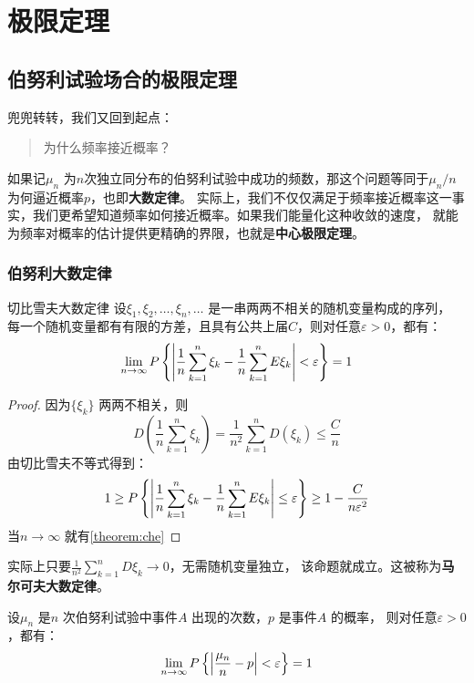 \chapter{极限定理}
\section{伯努利试验场合的极限定理}
兜兜转转，我们又回到起点：
\begin{quote}
    为什么频率接近概率？
\end{quote}

如果记\(\mu_{n}\) 为\(n\)次独立同分布的伯努利试验中成功的频数，那这个问题等同于\(\mu_{n}/n\)
为何逼近概率\(p\)，也即\textbf{大数定律}。
实际上，我们不仅仅满足于频率接近概率这一事实，我们更希望知道频率如何接近概率。如果我们能量化这种收敛的速度，
就能为频率对概率的估计提供更精确的界限，也就是\textbf{中心极限定理}。
\subsection{伯努利大数定律}
\begin{theorem}[che]{切比雪夫大数定律}
    设\(\xi_{1}, \xi_2, \dots ,\xi_{n},\dots \) 是一串两两不相关的随机变量构成的序列，
    每一个随机变量都有有限的方差，且具有公共上届\(C\)，则对任意\(\varepsilon>0\)，都有：
    \[
        \lim_{n \to \infty} P\left\{\left|\frac{1}{n} \sum_{k=1}^{n} \xi_{k} -
        \frac{1}{n} \sum_{k=1}^{n} E\xi_{k}\right| < \varepsilon\right\} = 1
    \]
\end{theorem}

\begin{proof}
    因为\(\{\xi_{k}\}\) 两两不相关，则\[
        D\left( \frac{1}{n} \sum_{k=1}^{n} \xi_{k} \right) =
        \frac{1}{n^2} \sum_{k=1}^{n} D(\xi_{k}) \leq \frac{C}{n}
    \]
    由切比雪夫不等式得到：
    \[
        1 \geq P\left\{\left|\frac{1}{n} \sum_{k=1}^{n} \xi_{k} -
        \frac{1}{n} \sum_{k=1}^{n} E\xi_{k}\right| \leq  \varepsilon\right\} \geq
        1- \frac{C}{n\varepsilon^2}
    \]
    当\(n\to \infty\) 就有\cref{theorem:che}
\end{proof}

实际上只要\(\frac{1}{n^{2}} \sum_{k=1}^{n} D\xi_{k} \to 0\)，无需随机变量独立，
该命题就成立。这被称为\textbf{马尔可夫大数定律}。

\begin{theorem}[伯努利大数定律]
    设\(\mu_{n}\) 是\(n\) 次伯努利试验中事件\(A\) 出现的次数，\(p\) 是事件\(A\) 的概率，
    则对任意\(\varepsilon>0\)，都有：
    \[
        \lim_{n \to \infty} P\left\{\left| \frac{\mu_{n}}{n} - p\right| < \varepsilon\right\} = 1
    \]
\end{theorem}

